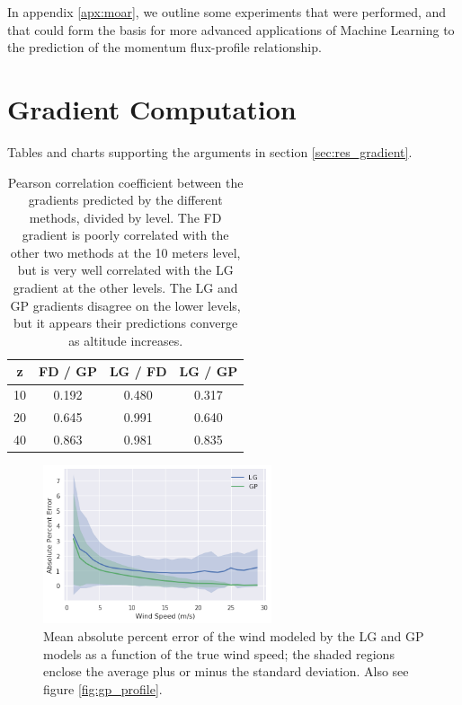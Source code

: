 \documentclass[a4paper,11pt]{kth-mag}
\begin{document}
In appendix \ref{apx:moar}, we outline some experiments that were performed, and that could form the basis for more advanced applications of Machine Learning to the prediction of the momentum flux-profile relationship.

\appendix
\addappheadtotoc

\chapter{Gradient Computation}
\label{apx:gradient}

Tables and charts supporting the arguments in section \ref{sec:res_gradient}.


\begin{table}[h]
\centering
\caption{Pearson correlation coefficient between the gradients predicted by the different methods, divided by level. The FD gradient is poorly correlated with the other two methods at the 10 meters level, but is very well correlated with the LG gradient at the other levels. The LG and GP gradients disagree on the lower levels, but it appears their predictions converge as altitude increases.}
\label{tbl:gradients_corr}
\begin{tabular}{c|c|c|c}
\toprule
\textbf{z} & \textbf{FD / GP} & \textbf{LG / FD} & \textbf{LG / GP} \\ \midrule
 	10 & 	0.192 & 0.480 &	0.317 \\
 	20 &	0.645 	& 0.991 &	0.640 \\
 	40 &	0.863 & 0.981 &	0.835 \\
\bottomrule
\end{tabular}
\end{table}

\begin{figure}[h]
    \centering
	\includegraphics[width=0.6\textwidth]{images/gp_log_perc_err_wind_speed}
	\caption{Mean absolute percent error of the wind modeled by the LG and GP models as a function of the true wind speed; the shaded regions enclose the average plus or minus the standard deviation. Also see figure \ref{fig:gp_profile}.}
	\label{fig:gp_log_perc_err_wind_speed}
\end{figure}
\end{document}
